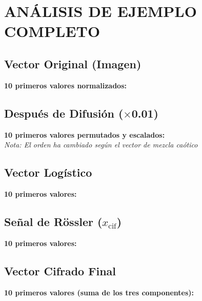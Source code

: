 \documentclass[12pt,a4paper]{article}
\begin{document}
\section{ANÁLISIS DE EJEMPLO COMPLETO}

\subsection{Vector Original (Imagen)}
\textbf{10 primeros valores normalizados:}
\begin{equation*}
[0.5686, 0.3412, 0.7961, 0.6118, 0.3608, 0.7765, 0.5255, 0.2980, 0.8275, 0.6549]
\end{equation*}

\subsection{Después de Difusión ($\times$0.01)}
\textbf{10 primeros valores permutados y escalados:}
\begin{equation*}
[0.0057, 0.0034, 0.0080, 0.0061, 0.0036, 0.0078, 0.0053, 0.0030, 0.0083, 0.0065]
\end{equation*}
\textit{Nota: El orden ha cambiado según el vector de mezcla caótico}

\subsection{Vector Logístico}
\textbf{10 primeros valores:}
\begin{equation*}
[0.4000, 0.9564, 0.1666, 0.5544, 0.9866, 0.0527, 0.1995, 0.6373, 0.9228, 0.2843]
\end{equation*}

\subsection{Señal de Rössler ($x_{\text{cif}}$)}
\textbf{10 primeros valores:}
\begin{equation*}
[-8.2346, -8.2410, -8.2476, -8.2543, -8.2612, -8.2682, -8.2753, -8.2825, -8.2899, -8.2974]
\end{equation*}

\subsection{Vector Cifrado Final}
\textbf{10 primeros valores (suma de los tres componentes):}
\begin{equation*}
[-7.8289, -7.2812, -8.0726, -7.6938, -7.2710, -7.2077, -7.0705, -6.6422, -7.3588, -7.0065]
\end{equation*}
\end{document}
